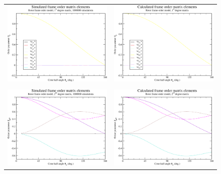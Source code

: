 \begin{figure}
\centering
  \begin{tabular}{@{}cc@{}}
    \includegraphics[width=.5\textwidth]{images/frame_order_matrix/Sij_rotor_in_frame_theta_z_ens1000000.eps} &
    \includegraphics[width=.5\textwidth]{images/frame_order_matrix/Sij_rotor_in_frame_theta_z_calc.eps} \\
    \\[-5pt]
    \includegraphics[width=.5\textwidth]{images/frame_order_matrix/Sijkl_rotor_in_frame_theta_z_ens1000000.eps} &
    \includegraphics[width=.5\textwidth]{images/frame_order_matrix/Sijkl_rotor_in_frame_theta_z_calc.eps} \\

\end{tabular}
\end{figure}
